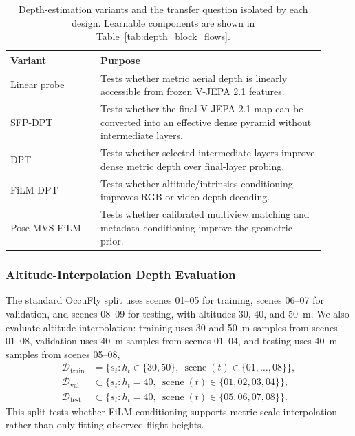 \begin{table}[t]
\centering
\caption{Depth-estimation variants and the transfer question isolated by each design. Learnable components are shown in Table~\ref{tab:depth_block_flows}.}
\label{tab:method_depth_variants}
\begin{tabular}{p{0.26\linewidth}p{0.65\linewidth}}
\toprule
\textbf{Variant} & \textbf{Purpose} \\
\midrule
Linear probe & Tests whether metric aerial depth is linearly accessible from frozen V-JEPA 2.1 features. \\
SFP-DPT & Tests whether the final V-JEPA 2.1 map can be converted into an effective dense pyramid without intermediate layers. \\
DPT & Tests whether selected intermediate layers improve dense metric depth over final-layer probing. \\
FiLM-DPT & Tests whether altitude/intrinsics conditioning improves RGB or video depth decoding. \\
Pose-MVS-FiLM & Tests whether calibrated multiview matching and metadata conditioning improve the geometric prior. \\
\bottomrule
\end{tabular}
\end{table}

\subsubsection{Altitude-Interpolation Depth Evaluation}
\label{sec:method_altitude_interpolation_depth}

The standard OccuFly split uses scenes 01--05 for training, scenes 06--07 for validation, and scenes 08--09 for testing, with altitudes 30, 40, and 50~m. We also evaluate altitude interpolation: training uses 30 and 50~m samples from scenes 01--08, validation uses 40~m samples from scenes 01--04, and testing uses 40~m samples from scenes 05--08,
\begin{align}
    \mathcal{D}_{\mathrm{train}} & = \{s_t: h_t\in\{30,50\},\ \operatorname{scene}(t)\in\{01,\ldots,08\}\}, \\
    \mathcal{D}_{\mathrm{val}} & \subset \{s_t: h_t=40,\ \operatorname{scene}(t)\in\{01,02,03,04\}\}, \\
    \mathcal{D}_{\mathrm{test}} & \subset \{s_t: h_t=40,\ \operatorname{scene}(t)\in\{05,06,07,08\}\}.
\end{align}
This split tests whether FiLM conditioning supports metric scale interpolation rather than only fitting observed flight heights.

